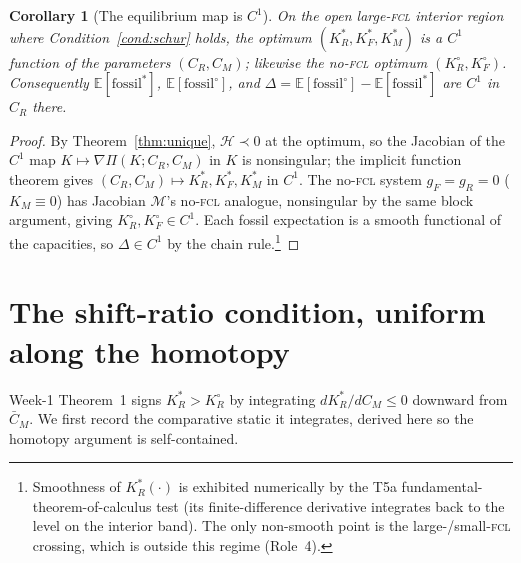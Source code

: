\documentclass[11pt,reqno]{amsart}
\theoremstyle{plain}
\newtheorem{corollary}{Corollary}
\theoremstyle{definition}
\theoremstyle{remark}
\newcommand{\KM}{K_M}
\newcommand{\KRs}{K_R^{*}}
\newcommand{\KFs}{K_F^{*}}
\newcommand{\KMs}{K_M^{*}}
\newcommand{\KRo}{K_R^{\circ}}
\newcommand{\KFo}{K_F^{\circ}}
\newcommand{\CM}{C_M}
\newcommand{\CR}{C_R}
\newcommand{\CMbar}{\bar C_M}
\newcommand{\E}{\mathbb{E}}
\newcommand{\Hcal}{\mathcal H}
\begin{document}
\begin{corollary}[The equilibrium map is $C^{1}$]\label{cor:c1}
On the open large-\textsc{fcl} interior region where Condition~\ref{cond:schur}
holds, the optimum $(\KRs,\KFs,\KMs)$ is a $C^{1}$ function of the parameters
$(\CR,\CM)$; likewise the no-\textsc{fcl} optimum $(\KRo,\KFo)$. Consequently
$\E[\text{fossil}^{*}]$, $\E[\text{fossil}^{\circ}]$, and
$\Delta=\E[\text{fossil}^{\circ}]-\E[\text{fossil}^{*}]$ are $C^{1}$ in $\CR$ there.
\end{corollary}
\begin{proof}
By Theorem~\ref{thm:unique}, $\Hcal\prec0$ at the optimum, so the Jacobian of the
$C^{1}$ map $K\mapsto\nabla\Pi(K;\CR,\CM)$ in $K$ is nonsingular; the implicit
function theorem gives $(\CR,\CM)\mapsto\KRs,\KFs,\KMs$ in $C^{1}$. The
no-\textsc{fcl} system $g_F=g_R=0$ ($\KM\equiv0$) has Jacobian $\mathcal M$'s
no-\textsc{fcl} analogue, nonsingular by the same block argument, giving
$\KRo,\KFo\in C^{1}$. Each fossil expectation is a smooth functional of the
capacities, so $\Delta\in C^{1}$ by the chain rule.\footnote{Smoothness of
$\KRs(\cdot)$ is exhibited numerically by the T5a fundamental-theorem-of-calculus
test (its finite-difference derivative integrates back to the level on the interior
band). The only non-smooth point is the large-/small-\textsc{fcl} crossing, which is
outside this regime (Role~4).}
\end{proof}

\section{The shift-ratio condition, uniform along the homotopy}\label{sec:homotopy}

Week-1 Theorem~1 signs $\KRs>\KRo$ by integrating $d\KRs/d\CM\le0$ downward from
$\CMbar$. We first record the comparative static it integrates, derived here so the
homotopy argument is self-contained.
\end{document}
